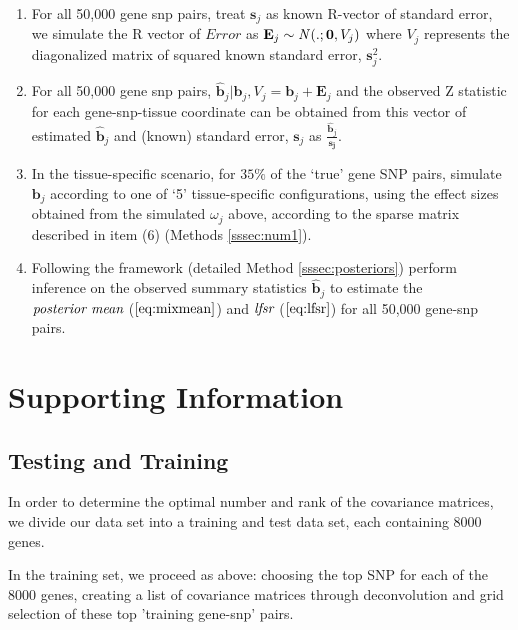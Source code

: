 \begin{enumerate}
\begin{enumerate}
\item For all 50,000 gene snp pairs, treat $\bm{s}_{j}$ as known R-vector of standard error, we simulate the R vector of $Error$ as $\textbf{E}_{j} \sim {\it N} (.; \bm{0}, V_{j} )$ where $V_{j} $ represents the diagonalized matrix of squared known standard error, $\bm{s}_{j}^{2}$. 
\item For all 50,000 gene snp pairs, $\hat{\bm{b}}_{j} | \bm{b}_{j} , V_{j} = \bm{b}_{j} + \textbf{E}_{j}$ %
and the observed Z statistic for each gene-snp-tissue coordinate can be obtained from this vector of estimated $\hat{\bm{b}}_{j}$ and (known) standard error, $\textbf{s}_{j}$ as $\frac{\hat{\bm{b}}_{j}}{\bm{s_{j}}}$.
\item In the tissue-specific scenario, for $35\%$ of the `true' gene SNP pairs, simulate $\bm{b}_{j}$ according to one of `5' tissue-specific configurations, using the effect sizes obtained from the simulated $\omega_{j}$ above, according to the sparse matrix described in item (6) (Methods \ref{sssec:num1}). 
\item Following the framework (detailed Method \ref {sssec:posteriors}) perform inference on the observed summary statistics $\hat{\bm{b}}_{j}$ to estimate the $\emph{posterior mean}$ ($\ref{eq:mixmean}$) and $\emph{lfsr}$ ($\ref{eq:lfsr}$) for all 50,000 gene-snp pairs. 
\end{enumerate}


\section*{Supporting Information}

\subsection{Testing and Training}

In order to determine the optimal number and rank of the covariance matrices, we divide our data set into a training and test data set, each containing 8000 genes.

In the training set, we proceed as above: choosing the top SNP for each of the 8000 genes, creating a list of covariance matrices through deconvolution and grid selection of these top 'training gene-snp' pairs. 


\end{enumerate}
